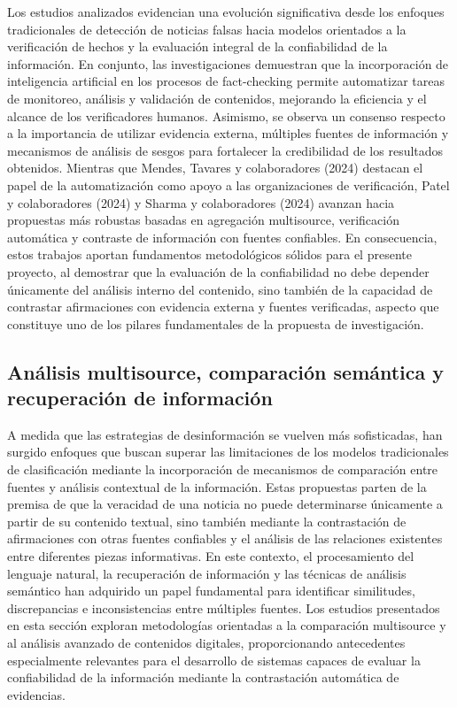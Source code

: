 \documentclass[12pt]{article}
\begin{document}
Los estudios analizados evidencian una evolución significativa desde los enfoques tradicionales de detección de noticias falsas hacia modelos orientados a la verificación de hechos y la evaluación integral de la confiabilidad de la información. En conjunto, las investigaciones demuestran que la incorporación de inteligencia artificial en los procesos de fact-checking permite automatizar tareas de monitoreo, análisis y validación de contenidos, mejorando la eficiencia y el alcance de los verificadores humanos. Asimismo, se observa un consenso respecto a la importancia de utilizar evidencia externa, múltiples fuentes de información y mecanismos de análisis de sesgos para fortalecer la credibilidad de los resultados obtenidos. Mientras que Mendes, Tavares y colaboradores (2024) destacan el papel de la automatización como apoyo a las organizaciones de verificación, Patel y colaboradores (2024) y Sharma y colaboradores (2024) avanzan hacia propuestas más robustas basadas en agregación multisource, verificación automática y contraste de información con fuentes confiables. En consecuencia, estos trabajos aportan fundamentos metodológicos sólidos para el presente proyecto, al demostrar que la evaluación de la confiabilidad no debe depender únicamente del análisis interno del contenido, sino también de la capacidad de contrastar afirmaciones con evidencia externa y fuentes verificadas, aspecto que constituye uno de los pilares fundamentales de la propuesta de investigación.

\subsection*{Análisis multisource, comparación semántica y recuperación de información}

A medida que las estrategias de desinformación se vuelven más sofisticadas, han surgido enfoques que buscan superar las limitaciones de los modelos tradicionales de clasificación mediante la incorporación de mecanismos de comparación entre fuentes y análisis contextual de la información. Estas propuestas parten de la premisa de que la veracidad de una noticia no puede determinarse únicamente a partir de su contenido textual, sino también mediante la contrastación de afirmaciones con otras fuentes confiables y el análisis de las relaciones existentes entre diferentes piezas informativas. En este contexto, el procesamiento del lenguaje natural, la recuperación de información y las técnicas de análisis semántico han adquirido un papel fundamental para identificar similitudes, discrepancias e inconsistencias entre múltiples fuentes. Los estudios presentados en esta sección exploran metodologías orientadas a la comparación multisource y al análisis avanzado de contenidos digitales, proporcionando antecedentes especialmente relevantes para el desarrollo de sistemas capaces de evaluar la confiabilidad de la información mediante la contrastación automática de evidencias.
\end{document}
